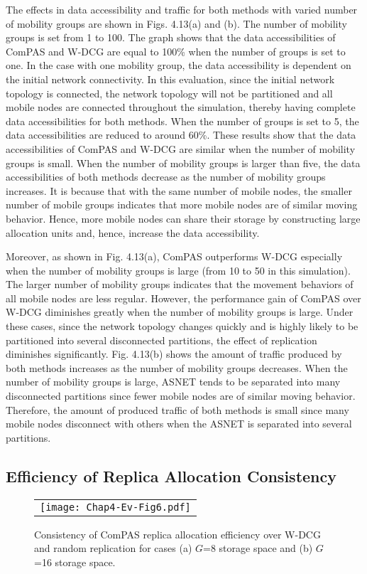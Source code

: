 The effects in data accessibility and traffic for both methods with varied number of mobility groups are shown in Figs. 4.13(a) and (b). The number of mobility groups is set from 1 to 100. The graph shows that the data accessibilities of ComPAS and W-DCG are equal to 100\% when the number of groups is set to one. In the case with one mobility group, the data accessibility is dependent on the initial network connectivity. In this evaluation, since the initial network topology is connected, the network topology will not be partitioned and all mobile nodes are connected throughout the simulation, thereby having complete data accessibilities for both methods. When the number of groups is set to 5, the data accessibilities are reduced to around 60\%. These results show that the data accessibilities of ComPAS and W-DCG are similar when the number of mobility groups is small. When the number of mobility groups is larger than five, the data accessibilities of both methods decrease as the number of mobility groups increases. It is because that with the same number of mobile nodes, the smaller number of mobile groups indicates that more mobile nodes are of similar moving behavior. Hence, more mobile nodes can share their storage by constructing large allocation units and, hence, increase the data accessibility.

Moreover, as shown in Fig. 4.13(a), ComPAS outperforms W-DCG especially when the number of mobility groups is large (from 10 to 50 in this simulation). The larger number of mobility groups indicates that the movement behaviors of all mobile nodes are less regular. However, the performance gain of ComPAS over W-DCG diminishes greatly when the number of mobility groups is large. Under these cases, since the network topology changes quickly and is highly likely to be partitioned into several disconnected partitions, the effect of replication diminishes significantly. Fig. 4.13(b) shows the amount of traffic produced by both methods increases as the number of mobility groups decreases. When the number of mobility groups is large, ASNET tends to be separated into many disconnected partitions since fewer mobile nodes are of similar moving behavior. Therefore, the amount of produced traffic of both methods is small since many mobile nodes disconnect with others when the ASNET is separated into several partitions.

\subsection{Efficiency of Replica Allocation Consistency}\label{Chap4_05_05}
\begin{figure}[h]
\begin{center}
  \begin{tabular}{c}
  \texttt{[image: Chap4-Ev-Fig6.pdf]}
  \end{tabular}
  \caption{Consistency of ComPAS replica allocation efficiency over W-DCG and random replication for cases (a) $G$=8 storage space and (b) $G$=16 storage space.}
\end{center}
\end{figure}

